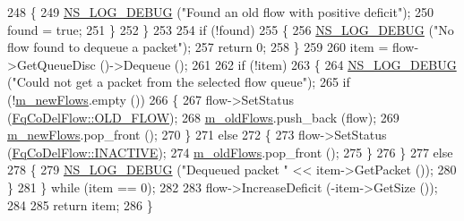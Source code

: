 \begin{DoxyCode}
248             \{
249               \hyperlink{group__logging_ga413f1886406d49f59a6a0a89b77b4d0a}{NS\_LOG\_DEBUG} (\textcolor{stringliteral}{"Found an old flow with positive deficit"});
250               found = \textcolor{keyword}{true};
251             \}
252         \}
253 
254       \textcolor{keywordflow}{if} (!found)
255         \{
256           \hyperlink{group__logging_ga413f1886406d49f59a6a0a89b77b4d0a}{NS\_LOG\_DEBUG} (\textcolor{stringliteral}{"No flow found to dequeue a packet"});
257           \textcolor{keywordflow}{return} 0;
258         \}
259 
260       item = flow->GetQueueDisc ()->Dequeue ();
261 
262       \textcolor{keywordflow}{if} (!item)
263         \{
264           \hyperlink{group__logging_ga413f1886406d49f59a6a0a89b77b4d0a}{NS\_LOG\_DEBUG} (\textcolor{stringliteral}{"Could not get a packet from the selected flow queue"});
265           \textcolor{keywordflow}{if} (!\hyperlink{classns3_1_1FqCoDelQueueDisc_ae0d12b788b8519457393fa0b37714947}{m\_newFlows}.empty ())
266             \{
267               flow->SetStatus (\hyperlink{classns3_1_1FqCoDelFlow_afbdbeaa5fc8659ada26a5d7f0e277b39a16cf978971383163caae2cc85e8c7df6}{FqCoDelFlow::OLD\_FLOW});
268               \hyperlink{classns3_1_1FqCoDelQueueDisc_a025a35ed71b066c207dcc74afae8f215}{m\_oldFlows}.push\_back (flow);
269               \hyperlink{classns3_1_1FqCoDelQueueDisc_ae0d12b788b8519457393fa0b37714947}{m\_newFlows}.pop\_front ();
270             \}
271           \textcolor{keywordflow}{else}
272             \{
273               flow->SetStatus (\hyperlink{classns3_1_1FqCoDelFlow_afbdbeaa5fc8659ada26a5d7f0e277b39a78fb27260b3ab5ae4be536a7c1db2648}{FqCoDelFlow::INACTIVE});
274               \hyperlink{classns3_1_1FqCoDelQueueDisc_a025a35ed71b066c207dcc74afae8f215}{m\_oldFlows}.pop\_front ();
275             \}
276         \}
277       \textcolor{keywordflow}{else}
278         \{
279           \hyperlink{group__logging_ga413f1886406d49f59a6a0a89b77b4d0a}{NS\_LOG\_DEBUG} (\textcolor{stringliteral}{"Dequeued packet "} << item->GetPacket ());
280         \}
281     \} \textcolor{keywordflow}{while} (item == 0);
282 
283   flow->IncreaseDeficit (-item->GetSize ());
284 
285   \textcolor{keywordflow}{return} item;
286 \}
\end{DoxyCode}
